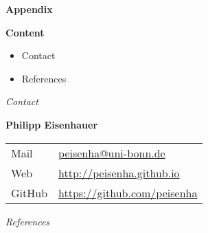 
\beginbackup\appendix
\begin{frame}\begin{center}
\LARGE\textbf{Appendix}
\end{center}\end{frame}
\begin{frame}
\textbf{Content}\medskip
\begin{itemize}\setlength\itemsep{1em}
\item Contact
\item References
\end{itemize}
\end{frame}
\begin{frame}\begin{center}
\LARGE\textit{Contact}
\end{center}\end{frame}
\begin{frame}
\textbf{Philipp Eisenhauer}\\\vspace{0.5cm}
\begin{tabular}{ll}
Mail		    & \href{mailto:peisenha@uni-bonn.de}{peisenha@uni-bonn.de}\\
Web     	  & \url{http://peisenha.github.io} \\
GitHub      & \url{https://github.com/peisenha}\\
\end{tabular}
\end{frame}
\begin{frame}\begin{center}
\LARGE\textit{References}
\end{center}\end{frame}
\begin{frame}[allowframebreaks]\frametitle{}






\end{frame}

\backupend
